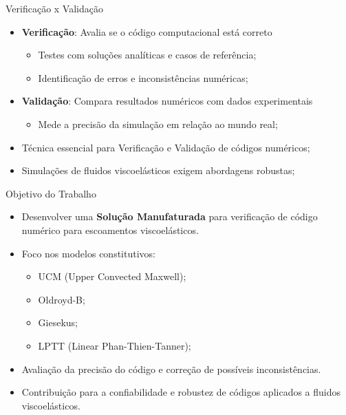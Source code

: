 \begin{frame}{Verificação x Validação}
\begin{itemize}
    \item \textbf{Verificação}: Avalia se o código computacional está correto
    \begin{itemize}
        \item Testes com soluções analíticas e casos de referência;
        \item Identificação de erros e inconsistências numéricas;
    \end{itemize}
    \item \textbf{Validação}: Compara resultados numéricos com dados experimentais
    \begin{itemize}
        \item Mede a precisão da simulação em relação ao mundo real;
    \end{itemize}
    \item Técnica essencial para Verificação e Validação de códigos numéricos;
    \item Simulações de fluidos viscoelásticos exigem abordagens robustas;
\end{itemize}
\end{frame}

\begin{frame}{Objetivo do Trabalho}
\begin{itemize}
    \item Desenvolver uma \textbf{Solução Manufaturada} para verificação de código numérico para escoamentos viscoelásticos.
    \item Foco nos modelos constitutivos:
    \begin{itemize}
        \item UCM (Upper Convected Maxwell);
        \item Oldroyd-B;
        \item Giesekus;
        \item LPTT (Linear Phan-Thien-Tanner);
    \end{itemize}
    \item Avaliação da precisão do código e correção de possíveis inconsistências.
    \item Contribuição para a confiabilidade e robustez de códigos aplicados a fluidos viscoelásticos.
\end{itemize}
\end{frame}